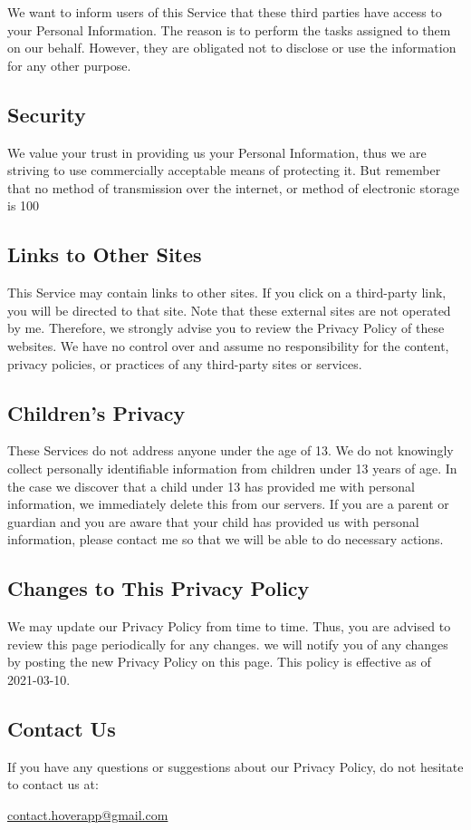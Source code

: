 We want to inform users of this Service that these third parties have access to your Personal Information. The reason is to perform the tasks assigned to them on our behalf. However, they are obligated not to disclose or use the information for any other purpose.

\subsection*{Security}
We value your trust in providing us your Personal Information, thus we are striving to use commercially acceptable means of protecting it. But remember that no method of transmission over the internet, or method of electronic storage is 100%

\subsection*{Links to Other Sites}
This Service may contain links to other sites. If you click on a third-party link, you will be directed to that site. Note that these external sites are not operated by me. Therefore, we strongly advise you to review the Privacy Policy of these websites. We have no control over and assume no responsibility for the content, privacy policies, or practices of any third-party sites or services.

\subsection*{Children’s Privacy}
These Services do not address anyone under the age of 13. We do not knowingly collect personally identifiable information from children under 13 years of age. In the case we discover that a child under 13 has provided me with personal information, we immediately delete this from our servers. If you are a parent or guardian and you are aware that your child has provided us with personal information, please contact me so that we will be able to do necessary actions.

\subsection*{Changes to This Privacy Policy}
We may update our Privacy Policy from time to time. Thus, you are advised to review this page periodically for any changes. we will notify you of any changes by posting the new Privacy Policy on this page. This policy is effective as of 2021-03-10.

\subsection*{Contact Us}
If you have any questions or suggestions about our Privacy Policy, do not hesitate to contact us at:

\href{mailto:contact.hoverapp@gmail.com}{contact.hoverapp@gmail.com}
